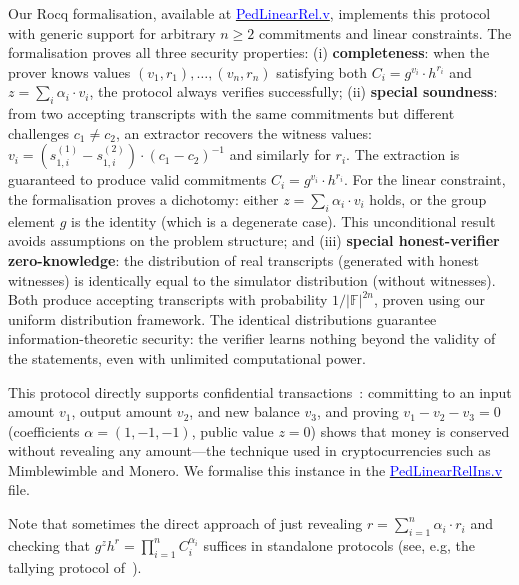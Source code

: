 \documentclass[sigconf,anonymous,review]{acmart}
\begin{document}
Our Rocq formalisation, available at \href{https://anonymous.4open.science/r/SigmaProtocol-EBA5/src/Crypto/PedLinearRel.v}{\textcolor{blue}{PedLinearRel.v}}, implements this protocol with generic support for arbitrary $n \geq 2$ commitments and linear constraints. The formalisation proves all three security properties: (i) \textbf{completeness}: when the prover knows values $(v_1, r_1), \ldots, (v_n, r_n)$ satisfying both $C_i = g^{v_i} \cdot h^{r_i}$ and $z = \sum_i \alpha_i \cdot v_i$, the protocol always verifies successfully; (ii) \textbf{special soundness}: from two accepting transcripts with the same commitments but different challenges $c_1 \neq c_2$, 
an extractor recovers the witness values: $v_i = (s_{1,i}^{(1)} - s_{1,i}^{(2)}) \cdot (c_1 - c_2)^{-1}$ 
and similarly for $r_i$. The extraction is guaranteed to produce valid commitments $C_i = g^{v_i} \cdot h^{r_i}$. 
For the linear constraint, the formalisation proves a dichotomy: either $z = \sum_i \alpha_i \cdot v_i$ holds, 
or the group element $g$ is the identity (which is a degenerate case). This unconditional result avoids 
assumptions on the problem structure; and (iii) \textbf{special honest-verifier zero-knowledge}: 
the distribution of real transcripts (generated with honest witnesses) is identically equal to the 
simulator distribution (without witnesses). Both produce accepting transcripts with probability 
$1/|\mathbb{F}|^{2n}$, proven using our uniform distribution framework. The identical distributions 
guarantee information-theoretic security: the verifier learns nothing beyond the validity of the 
statements, even with unlimited computational power.

This protocol directly supports confidential transactions~\cite{10.1007/978-3-030-17653-2_22}: committing to an input amount $v_1$, output amount $v_2$, and new balance $v_3$, and proving $v_1 - v_2 - v_3 = 0$ (coefficients $\alpha = (1, -1, -1)$, public value $z = 0$) shows that money is conserved without revealing any amount---the technique used in cryptocurrencies such as Mimblewimble and Monero. We formalise this instance in the \href{https://anonymous.4open.science/r/SigmaProtocol-EBA5/src/Examples/PedLinearRelIns.v}{\textcolor{blue}{PedLinearRelIns.v}} file.

Note that sometimes the direct approach of just revealing $r=\sum_{i=1}^{n} \alpha_i \cdot r_i$ and checking that $g^z h^r = \prod_{i=1}^n C_i^{\alpha_i}$ suffices in standalone protocols (see, e.g, the tallying protocol of~\cite{CFSY96}).
\end{document}
